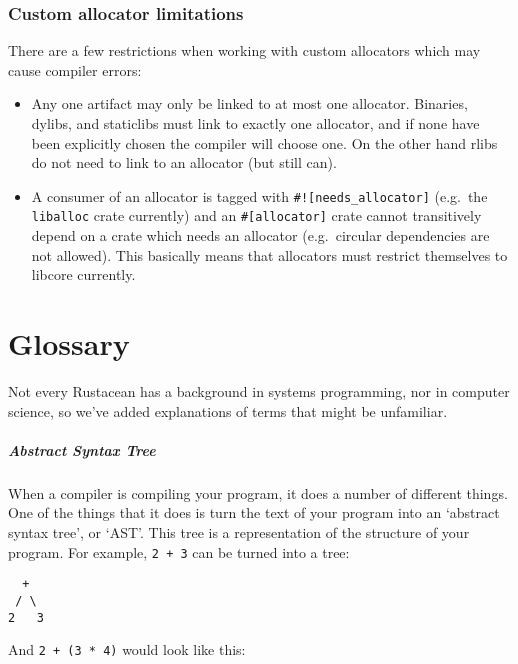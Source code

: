 \documentclass[a4paper,]{book}
\renewcommand*{\hypertarget}[3][\ar]{%
  \def\ar{#2}%
  \label{#1}%
  #3}
\let\oldparagraph\paragraph
\renewcommand{\paragraph}[1]{\oldparagraph{#1}\mbox{}}
\begin{document}
\subsection{Custom allocator
limitations}\label{custom-allocator-limitations}

There are a few restrictions when working with custom allocators which
may cause compiler errors:

\begin{itemize}
\item
  Any one artifact may only be linked to at most one allocator.
  Binaries, dylibs, and staticlibs must link to exactly one allocator,
  and if none have been explicitly chosen the compiler will choose one.
  On the other hand rlibs do not need to link to an allocator (but still
  can).
\item
  A consumer of an allocator is tagged with
  \texttt{\#!{[}needs\_allocator{]}} (e.g.~the \texttt{liballoc} crate
  currently) and an \texttt{\#{[}allocator{]}} crate cannot transitively
  depend on a crate which needs an allocator (e.g.~circular dependencies
  are not allowed). This basically means that allocators must restrict
  themselves to libcore currently.
\end{itemize}

\hypertarget{sec--glossary}{\chapter{Glossary}\label{sec--glossary}}

Not every Rustacean has a background in systems programming, nor in
computer science, so we've added explanations of terms that might be
unfamiliar.

\hypertarget{abstract-syntax-tree}{\paragraph{Abstract Syntax
Tree}\label{abstract-syntax-tree}}

When a compiler is compiling your program, it does a number of different
things. One of the things that it does is turn the text of your program
into an `abstract syntax tree', or `AST'. This tree is a representation
of the structure of your program. For example, \texttt{2\ +\ 3} can be
turned into a tree:

\begin{verbatim}
  +
 / \
2   3
\end{verbatim}

And \texttt{2\ +\ (3\ *\ 4)} would look like this:
\end{document}
